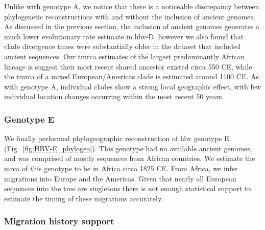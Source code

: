 Unlike with genotype A, we notice that there is a noticeable discrepancy between phylogenetic reconstructions with and without the inclusion of ancient genomes.
As discussed in the previous section, the inclusion of ancient genomes generates a much lower evolutionary rate estimate in \gls{hbv}-D, however we also found that clade divergence times were substantially older in the dataset that included ancient sequences.
Our \gls{tmrca} estimates of the largest predominantly African lineage is suggest their most recent shared ancestor existed circa 550 CE, while the \gls{tmrca} of a mixed European/Americas clade is estimated around 1100 CE.
As with genotype A, individual clades show a strong local geographic effect, with few individual location changes occurring within the most recent 50 years.

\subsubsection{Genotype E}

We finally performed phylogeographic reconstruction of \gls{hbv} genotype E (Fig.~\ref{fig:HBV-E_phylogeo}).
This genotype had no available ancient genomes, and was comprised of mostly sequences from African countries.
We estimate the \gls{mrca} of this genotype to be in Africa circa 1825 CE.
From Africa, we infer migrations into Europe and the Americas.
Given that nearly all European sequences into the tree are singletons there is not enough statistical support to estimate the timing of these migrations accurately.

\subsubsection{Migration history support}

